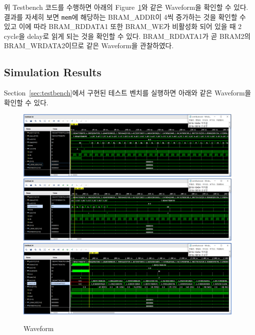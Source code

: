 \documentclass{article}
\newcommand{\orange}[1]{{\color{orange} #1}}
\begin{document}
\orange{
위 Testbench 코드를 수행하면 아래의 Figure~\ref{fig2}와 같은 Waveform을 확인할 수 있다. 결과를 자세히 보면 \texttt{mem}에 해당하는 BRAM\_ADDR이 4씩 증가하는 것을 확인할 수 있고 이에 따라 BRAM\_RDDATA1 또한 BRAM\_WE가 비활성화 되어 있을 때 2 cycle을 delay로 읽게 되는 것을 확인할 수 있다. BRAM\_RDDATA1가 곧 BRAM2의 BRAM\_WRDATA2이므로 같은 Waveform을 관찰하였다. \\
}

\subsection{Simulation Results}
Section~\ref{sec:testbench}에서 구현된 테스트 벤치를 실행하면 아래와 같은 Waveform을 확인할 수 있다.

\begin{figure}[ht]
	\centering
	\includegraphics[width=1.0\textwidth]{fig/My_PE_Controller_Waveform1.png}
	\includegraphics[width=1.0\textwidth]{fig/My_PE_Controller_Waveform2.png}
	\includegraphics[width=1.0\textwidth]{fig/My_PE_Controller_Waveform3.png}
\caption{Waveform}
\label{fig2}
\end{figure}
\end{document}

